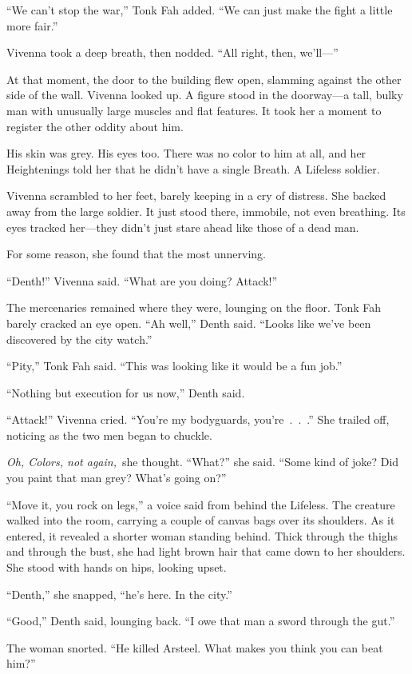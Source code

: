 “We can’t stop the war,” Tonk Fah added. “We can just make the fight a little more fair.”

Vivenna took a deep breath, then nodded. “All right, then, we’ll—”

At that moment, the door to the building flew open, slamming against the other side of the wall. Vivenna looked up. A figure stood in the doorway—a tall, bulky man with unusually large muscles and flat features. It took her a moment to register the other oddity about him.

His skin was grey. His eyes too. There was no color to him at all, and her Heightenings told her that he didn’t have a single Breath. A Lifeless soldier.

Vivenna scrambled to her feet, barely keeping in a cry of distress. She backed away from the large soldier. It just stood there, immobile, not even breathing. Its eyes tracked her—they didn’t just stare ahead like those of a dead man.

For some reason, she found that the most unnerving.

“Denth!” Vivenna said. “What are you doing? Attack!”

The mercenaries remained where they were, lounging on the floor. Tonk Fah barely cracked an eye open. “Ah well,” Denth said. “Looks like we’ve been discovered by the city watch.”

“Pity,” Tonk Fah said. “This was looking like it would be a fun job.”

“Nothing but execution for us now,” Denth said.

“Attack!” Vivenna cried. “You’re my bodyguards, you’re~.~.~.” She trailed off, noticing as the two men began to chuckle.

\textit{Oh, Colors, not again,}~she thought. “What?” she said. “Some kind of joke? Did you paint that man grey? What’s going on?”

“Move it, you rock on legs,” a voice said from behind the Lifeless. The creature walked into the room, carrying a couple of canvas bags over its shoulders. As it entered, it revealed a shorter woman standing behind. Thick through the thighs and through the bust, she had light brown hair that came down to her shoulders. She stood with hands on hips, looking upset.

“Denth,” she snapped, “he’s here. In the city.”

“Good,” Denth said, lounging back. “I owe that man a sword through the gut.”

The woman snorted. “He killed Arsteel. What makes you think you can beat him?”

